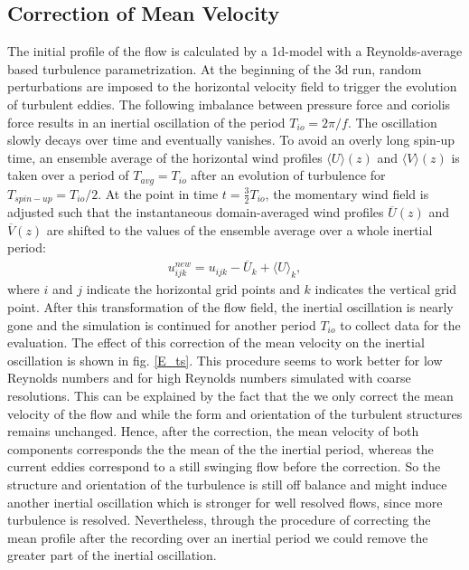 \documentclass[a4paper,11pt]{article}
\begin{document}
\subsection{Correction of Mean Velocity}

The initial profile of the flow is calculated by a 1d-model with a Reynolds-average based turbulence parametrization. At the beginning of the 3d run, random perturbations are imposed to the horizontal velocity field to trigger the evolution of turbulent eddies. The following imbalance between pressure force and coriolis force results in an inertial oscillation of the period $T_{io}=2\pi/f$. The oscillation slowly decays over time and eventually vanishes. To avoid an overly long spin-up time, an ensemble average of the horizontal wind profiles $\langle U\rangle(z)$ and $\langle V\rangle(z)$ is taken over a period of $T_{avg} = T_{io}$ after an evolution of turbulence for $T_{spin-up} = T_{io}/2$. At the point in time $t = \frac{3}{2}T_{io}$, the momentary wind field is adjusted such that the instantaneous domain-averaged wind profiles $\overline{U}(z)$ and $\overline{V}(z)$ are shifted to the values of the ensemble average over a whole inertial period:
\begin{align}
  u^{new}_{ijk} = u_{ijk} - \overline{U}_k + \langle U\rangle_k,
\end{align}
where $i$ and $j$ indicate the horizontal grid points and $k$ indicates the vertical grid point. After this transformation of the flow field, the inertial oscillation is nearly gone and the simulation is continued for another period $T_{io}$ to collect data for the evaluation. The effect of this correction of the mean velocity on the inertial oscillation is shown in fig. \ref{E_ts}. This procedure seems to work better for low Reynolds numbers and for high Reynolds numbers simulated with coarse resolutions. This can be explained by the fact that the we only correct the mean velocity of the flow and while the form and orientation of the turbulent structures remains unchanged. Hence, after the correction, the mean velocity of both components corresponds the the mean of the the inertial period, whereas the current eddies correspond to a still swinging flow before the correction. So the structure and orientation of the turbulence is still off balance and might induce another inertial oscillation which is stronger for well resolved flows, since more turbulence is resolved. Nevertheless, through the procedure of correcting the mean profile after the recording over an inertial period we could remove the greater part of the inertial oscillation.
\end{document}
